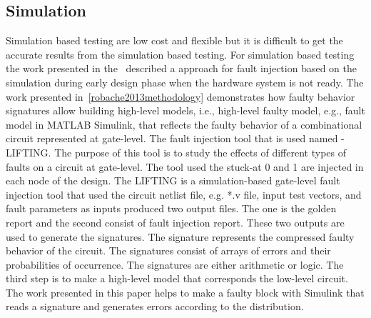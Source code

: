 
\subsection{Simulation}

Simulation based testing are low cost and flexible but it is difficult to get the accurate results from the simulation based testing. For simulation based testing the work presented in the~\cite{violante2004simulation} described a approach for fault injection based on the simulation during early design phase when the hardware system is not ready. The work presented in~\ref{robache2013methodology} demonstrates how faulty behavior signatures allow building high-level models, i.e., high-level faulty model, e.g., fault model in MATLAB Simulink, that reflects the faulty behavior of a combinational circuit represented at gate-level. The fault injection tool that is used named - LIFTING.  The purpose of this tool is to study the effects of different types of faults on a circuit at gate-level. The tool used the stuck-at 0 and 1 are injected in each node of the design. The LIFTING is a simulation-based gate-level fault injection tool that used the circuit netlist file, e.g.  *.v file, input test vectors, and fault parameters as inputs produced two output files. The one is the golden report and the second consist of fault injection report. These two outputs are used to generate the signatures.  The signature represents the compressed faulty behavior of the circuit. The signatures consist of arrays of errors and their probabilities of occurrence. The signatures are either arithmetic or logic.  The third step is to make a high-level model that corresponds the low-level circuit. The work presented in this paper helps to make a faulty block with Simulink that reads a signature and generates errors according to the distribution.

